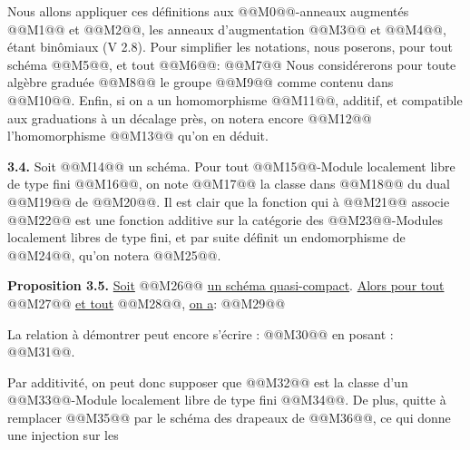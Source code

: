 

Nous allons appliquer ces définitions aux @@M0@@-anneaux augmentés @@M1@@ et @@M2@@, les anneaux d'augmentation @@M3@@ et @@M4@@, étant binômiaux (V 2.8). Pour simplifier les notations, nous poserons, pour tout schéma @@M5@@, et tout @@M6@@:
@@M7@@
Nous considérerons pour toute algèbre graduée @@M8@@ le groupe @@M9@@ comme contenu dans @@M10@@. Enfin, si on a un homomorphisme @@M11@@, additif, et compatible aux graduations à un décalage près, on notera encore @@M12@@ l'homomorphisme @@M13@@ qu'on en déduit.

\textbf{3.4.} Soit @@M14@@ un schéma. Pour tout @@M15@@-Module localement libre de type fini @@M16@@, on note @@M17@@ la classe dans @@M18@@ du dual @@M19@@ de @@M20@@. Il est clair que la fonction qui à @@M21@@ associe @@M22@@ est une fonction additive sur la catégorie des @@M23@@-Modules localement libres de type fini, et par suite définit un endomorphisme de @@M24@@, qu'on notera @@M25@@.

\textbf{Proposition 3.5.} \uline{Soit} @@M26@@ \uline{un schéma quasi-compact}. \uline{Alors pour tout} @@M27@@ \uline{et tout} @@M28@@, \uline{on a}:
@@M29@@

La relation à démontrer peut encore s'écrire :
@@M30@@
en posant : @@M31@@.

Par additivité, on peut donc supposer que @@M32@@ est la classe d'un @@M33@@-Module localement libre de type fini @@M34@@. De plus, quitte à remplacer @@M35@@ par le schéma des drapeaux de @@M36@@, ce qui donne une injection sur les
